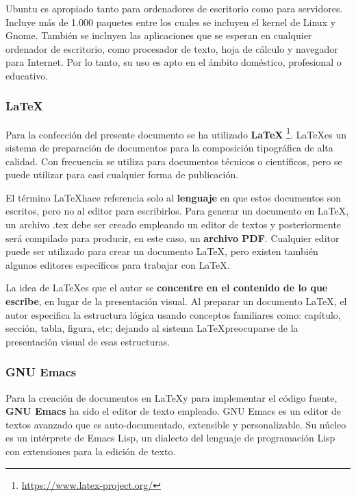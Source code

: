 Ubuntu es apropiado tanto para ordenadores de escritorio como para servidores. Incluye más de 1.000 paquetes entre los cuales se incluyen el kernel de Linux y Gnome. También se incluyen las aplicaciones que se esperan en cualquier ordenador de escritorio, como procesador de texto, hoja de cálculo y navegador para Internet. Por lo tanto, su uso es apto en el ámbito doméstico, profesional o educativo. 

\subsubsection{\LaTeX}
\label{sec:latex}

Para la confección del presente documento se ha utilizado \textbf{\LaTeX} \footnote{\url{https://www.latex-project.org/}}. \LaTeX es un sistema de preparación de documentos para la composición tipográfica de alta calidad. Con frecuencia se utiliza para documentos técnicos o científicos, pero se puede utilizar para casi cualquier forma de publicación.

El término \LaTeX hace referencia solo al \textbf{lenguaje} en que estos documentos son escritos, pero no al editor para escribirlos. Para generar un documento en \LaTeX, un archivo .tex debe ser creado empleando un editor de textos y posteriormente será compilado para producir, en este caso, un \textbf{archivo PDF}. Cualquier editor puede ser utilizado para crear un documento \LaTeX, pero existen también algunos editores específicos para trabajar con \LaTeX.

La idea de \LaTeX es que el autor se \textbf{concentre en el contenido de lo que escribe}, en lugar de la presentación visual. Al preparar un documento \LaTeX, el autor especifica la estructura lógica usando conceptos familiares como: capítulo, sección, tabla, figura, etc; dejando al sistema \LaTeX preocuparse de la presentación visual de esas estructuras.

\subsubsection{\acs{GNU} Emacs}
\label{sec:emacs}

Para la creación de documentos en \LaTeX y para implementar el código fuente, \textbf{\acs{GNU} Emacs} ha sido el editor de texto empleado. \acs{GNU} Emacs es un editor de textos avanzado que es auto-documentado, extensible y personalizable. Su núcleo es un intérprete de Emacs Lisp, un dialecto del lenguaje de programación Lisp con extensiones para la edición de texto. 

